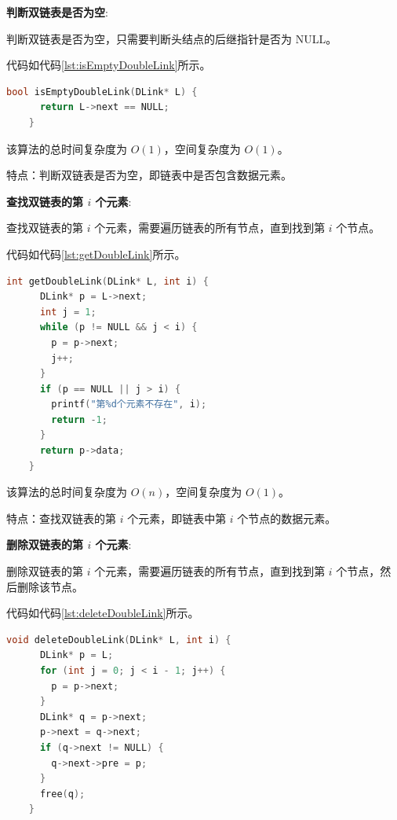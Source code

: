 \documentclass[lang=cn,newtx,10pt,scheme=chinese]{../elegantbook}
\begin{document}
  \textbf{判断双链表是否为空}:

  判断双链表是否为空，只需要判断头结点的后继指针是否为 NULL。

  代码如代码\ref{lst:isEmptyDoubleLink}所示。

  \begin{lstlisting}[language=C++, caption={判断双链表是否为空示例代码}, label={lst:isEmptyDoubleLink}]
    bool isEmptyDoubleLink(DLink* L) {
      return L->next == NULL;
    }
  \end{lstlisting}

  该算法的总时间复杂度为 $O(1)$，空间复杂度为 $O(1)$。

  特点：判断双链表是否为空，即链表中是否包含数据元素。

  \textbf{查找双链表的第 $i$ 个元素}:

  查找双链表的第 $i$ 个元素，需要遍历链表的所有节点，直到找到第 $i$ 个节点。

  代码如代码\ref{lst:getDoubleLink}所示。

  \begin{lstlisting}[language=C++, caption={查找双链表的第 $i$ 个元素示例代码}, label={lst:getDoubleLink}]
    int getDoubleLink(DLink* L, int i) {
      DLink* p = L->next;
      int j = 1;
      while (p != NULL && j < i) {
        p = p->next;
        j++;
      }
      if (p == NULL || j > i) {
        printf("第%d个元素不存在", i);
        return -1;
      }
      return p->data;
    }
  \end{lstlisting}

  该算法的总时间复杂度为 $O(n)$，空间复杂度为 $O(1)$。

  特点：查找双链表的第 $i$ 个元素，即链表中第 $i$ 个节点的数据元素。

  \textbf{删除双链表的第 $i$ 个元素}:

  删除双链表的第 $i$ 个元素，需要遍历链表的所有节点，直到找到第 $i$ 个节点，然后删除该节点。

  代码如代码\ref{lst:deleteDoubleLink}所示。

  \begin{lstlisting}[language=C++, caption={删除双链表的第 $i$ 个元素示例代码}, label={lst:deleteDoubleLink}]
    void deleteDoubleLink(DLink* L, int i) {
      DLink* p = L;
      for (int j = 0; j < i - 1; j++) {
        p = p->next;
      }
      DLink* q = p->next;
      p->next = q->next;
      if (q->next != NULL) {
        q->next->pre = p;
      }
      free(q);
    }
  \end{lstlisting}
\end{document}
